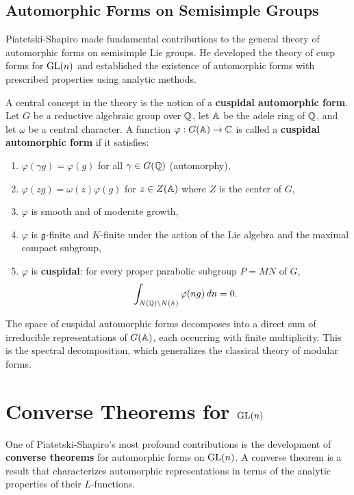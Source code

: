 \subsection{Automorphic Forms on Semisimple Groups}

Piatetski-Shapiro made fundamental contributions to the general theory of automorphic forms on semisimple Lie groups. He developed the theory of cusp forms for \(\operatorname{GL}(n)\) and established the existence of automorphic forms with prescribed properties using analytic methods.

A central concept in the theory is the notion of a \textbf{cuspidal automorphic form}. Let \(G\) be a reductive algebraic group over \(\mathbb{Q}\), let \(\mathbb{A}\) be the adele ring of \(\mathbb{Q}\), and let \(\omega\) be a central character. A function \(\varphi: G(\mathbb{A}) \to \mathbb{C}\) is called a \textbf{cuspidal automorphic form} if it satisfies:

\begin{enumerate}
    \item \(\varphi(\gamma g) = \varphi(g)\) for all \(\gamma \in G(\mathbb{Q})\) (automorphy),
    \item \(\varphi(zg) = \omega(z)\varphi(g)\) for \(z \in Z(\mathbb{A})\) where \(Z\) is the center of \(G\),
    \item \(\varphi\) is smooth and of moderate growth,
    \item \(\varphi\) is \({\mathfrak g}\)-finite and \(K\)-finite under the action of the Lie algebra and the maximal compact subgroup,
    \item \(\varphi\) is \textbf{cuspidal}: for every proper parabolic subgroup \(P = MN\) of \(G\),
    \[
    \int_{N(\mathbb{Q}) \backslash N(\mathbb{A})} \varphi(ng)\,dn = 0.
    \]
    \end{enumerate}

The space of cuspidal automorphic forms decomposes into a direct sum of irreducible representations of \(G(\mathbb{A})\), each occurring with finite multiplicity. This is the spectral decomposition, which generalizes the classical theory of modular forms.

\section{Converse Theorems for \texorpdfstring{\(\operatorname{GL}(n)\)}{GL(n)}}

One of Piatetski-Shapiro's most profound contributions is the development of \textbf{converse theorems} for automorphic forms on \(\operatorname{GL}(n)\). A converse theorem is a result that characterizes automorphic representations in terms of the analytic properties of their \(L\)-functions.

